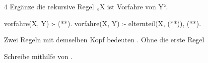 \documentclass[11pt]{article}
\begin{document}
\newpage
\begin{aufgabe}{4}
Ergänze die rekursive Regel „X ist Vorfahre von Y“.
\begin{prologluecke}
vorfahre(X, Y) :- (**).                   %
vorfahre(X, Y) :- elternteil(X, (**)), (**).   %
\end{prologluecke}
\begin{lueckentext}
Zwei Regeln mit demselben Kopf bedeuten . Ohne die erste Regel 
\end{lueckentext}
Schreibe  mithilfe von .\par
{}
\end{aufgabe}
\end{document}

